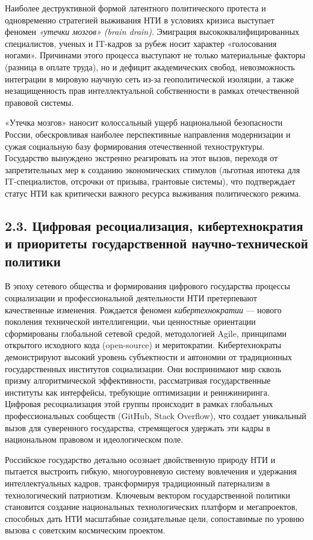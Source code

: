 Наиболее деструктивной формой латентного политического протеста и одновременно стратегией выживания НТИ в условиях кризиса выступает феномен \textit{«утечки мозгов» (brain drain)}. Эмиграция высококвалифицированных специалистов, ученых и IT-кадров за рубеж носит характер «голосования ногами». Причинами этого процесса выступают не только материальные факторы (разница в оплате труда), но и дефицит академических свобод, невозможность интеграции в мировую научную сеть из-за геополитической изоляции, а также незащищенность прав интеллектуальной собственности в рамках отечественной правовой системы. 

«Утечка мозгов» наносит колоссальный ущерб национальной безопасности России, обескровливая наиболее перспективные направления модернизации и сужая социальную базу формирования отечественной техноструктуры. Государство вынуждено экстренно реагировать на этот вызов, переходя от запретительных мер к созданию экономических стимулов (льготная ипотека для IT-специалистов, отсрочки от призыва, грантовые системы), что подтверждает статус НТИ как критически важного ресурса выживания политического режима.

\subsection{2.3. Цифровая ресоциализация, кибертехнократия и приоритеты государственной научно-технической политики}

В эпоху сетевого общества и формирования цифрового государства процессы социализации и профессиональной деятельности НТИ претерпевают качественные изменения. Рождается феномен \textit{кибертехнократии} --- нового поколения технической интеллигенции, чьи ценностные ориентации сформированы глобальной сетевой средой, методологией Agile, принципами открытого исходного кода (open-source) и меритократии. Кибертехнократы демонстрируют высокий уровень субъектности и автономии от традиционных государственных институтов социализации. Они воспринимают мир сквозь призму алгоритмической эффективности, рассматривая государственные институты как интерфейсы, требующие оптимизации и реинжиниринга. Цифровая ресоциализация этой группы происходит в рамках глобальных профессиональных сообществ (GitHub, Stack Overflow), что создает уникальный вызов для суверенного государства, стремящегося удержать эти кадры в национальном правовом и идеологическом поле.

Российское государство детально осознает двойственную природу НТИ и пытается выстроить гибкую, многоуровневую систему вовлечения и удержания интеллектуальных кадров, трансформируя традиционный патернализм в технологический патриотизм. Ключевым вектором государственной политики становится создание национальных технологических платформ и мегапроектов, способных дать НТИ масштабные созидательные цели, сопоставимые по уровню вызова с советским космическим проектом. 

